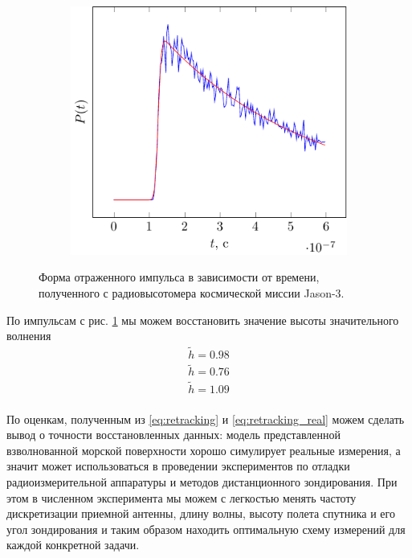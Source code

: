 \begin{figure}[ht]
\begin{subfigure}{0.49\linewidth}
    \end{subfigure}
    \begin{subfigure}{0.49\linewidth}
        \centering
        \includegraphics[width=\linewidth, page=6]{fig/retracking5}
    \end{subfigure}
    \caption{Форма отраженного импульса в зависимости от времени, полученного с
    радиовысотомера космической миссии Jason-3.}
    \label{fig:impulse_jason}
\end{figure}

По импульсам с рис. \ref{fig:impulse_jason} мы можем восстановить значение
высоты значительного волнения
\begin{equation}
    \begin{aligned}
        \label{eq:retracking_real}
        \tilde h = 0.98\\
        \tilde h = 0.76\\ 
        \tilde h = 1.09\\
    \end{aligned}
\end{equation}


По оценкам, полученным из \eqref{eq:retracking} и \eqref{eq:retracking_real}
можем сделать вывод о точности восстановленных данных: модель представленной
взволнованной морской поверхности хорошо симулирует реальные измерения, а
значит может использоваться в проведении экспериментов по отладки
радиоизмерительной аппаратуры и методов дистанционного зондирования. 
При этом в численном эксперимента мы можем с легкостью менять частоту
дискретизации приемной антенны, длину волны, высоту полета спутника и его угол
зондирования и таким образом находить оптимальную схему измерений для каждой
конкретной задачи.
